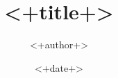 \documentclass[a4paper,fontset = windows]{ctexbook}
\begin{document}
\title{<+title+>}
\author{<+author+>}
\date{<+date+>}
\maketitle
\tableofcontents



\end{document}
